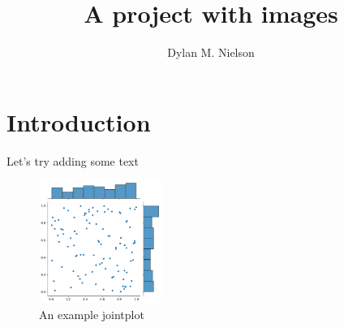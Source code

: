 \documentclass{article}
\title{A project with images}
\author{Dylan M. Nielson}
\date{}
\begin{document}
\maketitle

\section{Introduction}
Let's try adding some text
\begin{figure}[htp]
    \centering
    \includegraphics[width=4cm]{fig1.jpg}
    \caption{An example jointplot}
    \label{fig:jp}
\end{figure}
\end{document}
